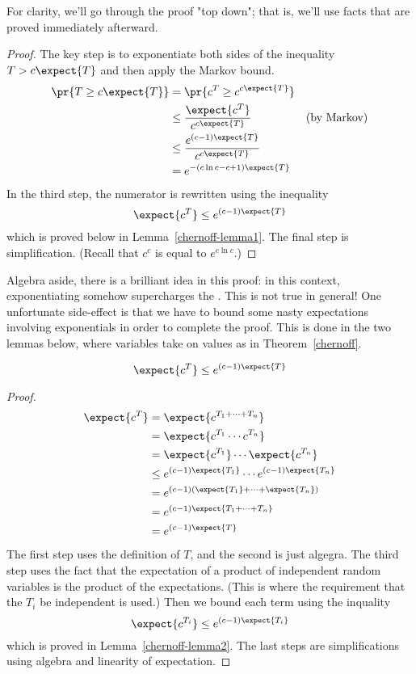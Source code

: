 For clarity, we'll go through the proof "top down"; that is, we'll use
facts that are proved immediately afterward.

\begin{proof} The key step is to exponentiate both sides of the
  inequality $T > c \expect{T}$ and then apply the Markov bound.
\begin{align*}
\pr{T \geq c \expect{T}} & = \pr{c^T \geq c^{c \expect{T}}} \\
  & \leq \frac{\expect{c^T}}{c^{c \expect{T}}} & \text{(by Markov)}\\
  & \leq \frac{e^{(c-1) \expect{T}}}{c^{c \expect{T}}} \\
  & = e^{- (c \ln c - c + 1) \expect{T}}
\end{align*}
In the third step, the numerator is rewritten using the inequality
\[
\expect{c^T} \leq e^{(c-1) \expect{T}}
\]
which is proved below in Lemma~\ref{chernoff-lemma1}.  The final step
is simplification.  (Recall that $c^c$ is equal to $e ^{c \ln c}$.)
\end{proof}

Algebra aside, there is a brilliant idea in this proof: in this
context, exponentiating somehow supercharges the .
This is not true in general!  One unfortunate side-effect is that we
have to bound some nasty expectations involving exponentials in order
to complete the proof.  This is done in the two lemmas below, where
variables take on values as in Theorem~\ref{chernoff}.

\begin{lemma}
\label{chernoff-lemma1}
\[
\expect{c^T} \leq e^{(c-1) \expect{T}}
\]
\end{lemma}

\begin{proof}
\begin{align*}
    \expect{c^T} & = \expect{c^{T_1 + \cdots + T_n}} \\
            & = \expect{c^{T_1} \cdots c^{T_n}} \\
            & = \expect{c^{T_1}}  \cdots \expect{c^{T_n}} \\
            & \leq e^{(c-1) \expect{T_1}} \cdots  e^{(c-1) \expect{T_n}} \\
            & = e^{(c-1) (\expect{T_1} + \cdots + \expect{T_n})} \\
            & = e^{(c-1) \expect{T_1 + \cdots + T_n}} \\
            & = e^{(c-1) \expect{T}}
\end{align*}
The first step uses the definition of $T$, and the second is just
algegra.  The third step uses the fact that the expectation of a
product of independent random variables is the product of the
expectations.  (This is where the requirement that the $T_i$ be
independent is used.)  Then we bound each term using the inquality
\[
    \expect{c^{T_i}} \leq e^{(c - 1) \expect{T_i}}
\]
which is proved in Lemma~\ref{chernoff-lemma2}.  The last steps are
simplifications using algebra and linearity of expectation.
\end{proof}

